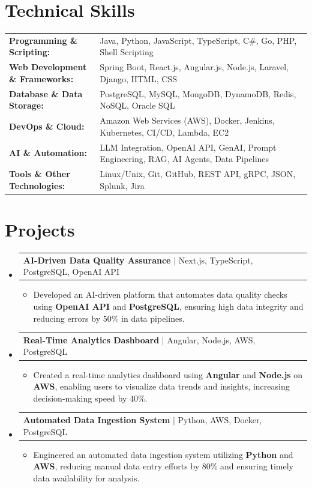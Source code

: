 \documentclass[letterpaper,10pt]{article}
\makeatletter
\newcommand{\resumeItem}[1]{
  \item{\fontsize{8pt}{9pt}\selectfont
    #1 \vspace{-3pt}
  }
}
\newcommand{\resumeProjectHeading}[2]{
    \item
    \begin{tabular*}{1.001\textwidth}{l@{\extracolsep{\fill}}r}
      \fontsize{8.5pt}{10pt}#1 & \textbf{\fontsize{8.5pt}{10pt} #2}\\
    \end{tabular*}\vspace{-7pt}
}
\newcommand{\resumeSubHeadingListStart}{\begin{itemize}[leftmargin=0pt, label={}]}
\newcommand{\resumeSubHeadingListEnd}{\end{itemize}}
\newcommand{\resumeItemListStart}{\begin{itemize}[leftmargin=*]}
\newcommand{\resumeItemListEnd}{\end{itemize}\vspace{-5pt}}
\makeatother
\begin{document}
\section{Technical Skills}
        \vspace{-14pt}
        \begin{table}[h]
            \fontsize{8pt}{9pt}\selectfont
            \begin{tabular}{p{0.3\linewidth} p{0.7\linewidth}}
                \textbf{Programming \& Scripting:} & Java, Python, JavaScript, TypeScript, C\#, Go, PHP, Shell Scripting \\
                \textbf{Web Development \& Frameworks:} & Spring Boot, React.js, Angular.js, Node.js, Laravel, Django, HTML, CSS \\
                \textbf{Database \& Data Storage:} & PostgreSQL, MySQL, MongoDB, DynamoDB, Redis, NoSQL, Oracle SQL \\
                \textbf{DevOps \& Cloud:} & Amazon Web Services (AWS), Docker, Jenkins, Kubernetes, CI/CD, Lambda, EC2 \\
                \textbf{AI \& Automation:} & LLM Integration, OpenAI API, GenAI, Prompt Engineering, RAG, AI Agents, Data Pipelines \\
                \textbf{Tools \& Other Technologies:} & Linux/Unix, Git, GitHub, REST API, gRPC, JSON, Splunk, Jira \\
            \end{tabular}
        \end{table}
 \vspace{-18pt}

\section{Projects}
    \vspace{-5pt}
    \resumeSubHeadingListStart
          \resumeProjectHeading
            {\textbf{AI-Driven Data Quality Assurance} $|$ Next.js, TypeScript, PostgreSQL, OpenAI API}{}
            \resumeItemListStart
                \resumeItem{Developed an AI-driven platform that automates data quality checks using \textbf{OpenAI API} and \textbf{PostgreSQL}, ensuring high data integrity and reducing errors by 50\% in data pipelines.}
            \resumeItemListEnd
        \vspace{-12pt}
    
        \resumeProjectHeading
            {\textbf{Real-Time Analytics Dashboard} $|$ Angular, Node.js, AWS, PostgreSQL}{}
        \resumeItemListStart
                \resumeItem{Created a real-time analytics dashboard using \textbf{Angular} and \textbf{Node.js} on \textbf{AWS}, enabling users to visualize data trends and insights, increasing decision-making speed by 40\%.}
        \resumeItemListEnd
      \vspace{-12pt}
      \resumeProjectHeading
        {\textbf{Automated Data Ingestion System} $|$ Python, AWS, Docker, PostgreSQL}{}
    \resumeItemListStart
            \resumeItem{Engineered an automated data ingestion system utilizing \textbf{Python} and \textbf{AWS}, reducing manual data entry efforts by 80\% and ensuring timely data availability for analysis.}
    \resumeItemListEnd
    \resumeSubHeadingListEnd
\end{document}
